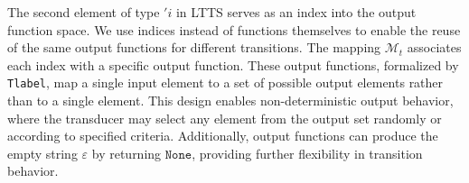 The second element of type $'i$ in LTTS serves as an index into the output function space. 
%
We use indices instead of functions themselves to enable the reuse of the same output functions for different transitions.
%
The mapping $\mathcal{M}_t$ associates each index with a specific output function. These output functions, formalized by \texttt{Tlabel}, map a single input element to a set of possible output elements rather than to a single element. This design enables non-deterministic output behavior, where the transducer may select any element from the output set randomly or according to specified criteria. Additionally, output functions can produce the empty string $\varepsilon$ by returning $\texttt{None}$, providing further flexibility in transition behavior.




